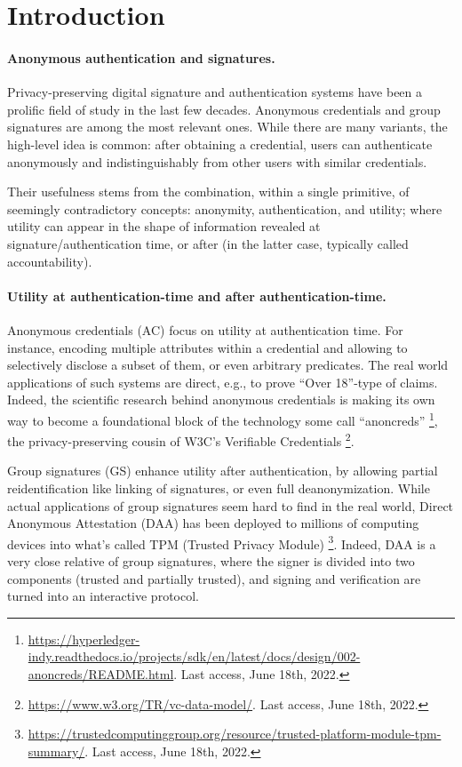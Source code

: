 \section{Introduction}
\label{sec:introduction}


\paragraph{Anonymous authentication and signatures.} %
Privacy-preserving digital signature and authentication systems have been a
prolific field of study in the last few decades. Anonymous credentials
\cite{chau85} and group signatures \cite{ch91} are among the most relevant ones.
While there are many variants, the high-level idea is common: after obtaining a
credential, users can authenticate anonymously and indistinguishably from other
users with similar credentials. 

Their usefulness stems from the combination, within a single primitive, of
seemingly contradictory concepts: anonymity, authentication, and utility; where
utility can appear in the shape of information revealed at signature/authentication
time, or after (in the latter case, typically called accountability).

\paragraph{Utility at authentication-time and after authentication-time.} %
Anonymous credentials (AC) focus on utility at authentication time. For
instance, encoding multiple attributes within a credential and allowing to
selectively disclose a subset of them, or even arbitrary predicates.
The real world applications of such systems are direct,
e.g., to prove ``Over 18''-type of claims. Indeed, the scientific research
behind anonymous credentials is making its own way to become a foundational
block of the technology some call ``anoncreds''%
\footnote{\url{https://hyperledger-indy.readthedocs.io/projects/sdk/en/latest/docs/design/002-anoncreds/README.html}. Last access, June 18th, 2022.},
the privacy-preserving cousin of W3C's Verifiable Credentials%
\footnote{\url{https://www.w3.org/TR/vc-data-model/}. Last access, June 18th,
  2022.}.

Group signatures (GS) enhance utility after authentication, by allowing partial
reidentification like linking of signatures, or even full deanonymization.
While actual applications of group signatures seem hard to find in the real
world, Direct Anonymous Attestation (DAA) \cite{bcc04,bl07,cdl16b} has been deployed to
millions of computing devices into what's called TPM (Trusted Privacy Module)%
\footnote{\url{https://trustedcomputinggroup.org/resource/trusted-platform-module-tpm-summary/}. Last access, June 18th, 2022.}.
Indeed, DAA is a very close relative of group signatures, where the signer is
divided into two components (trusted and partially trusted), and signing
and verification are turned into an interactive protocol.

